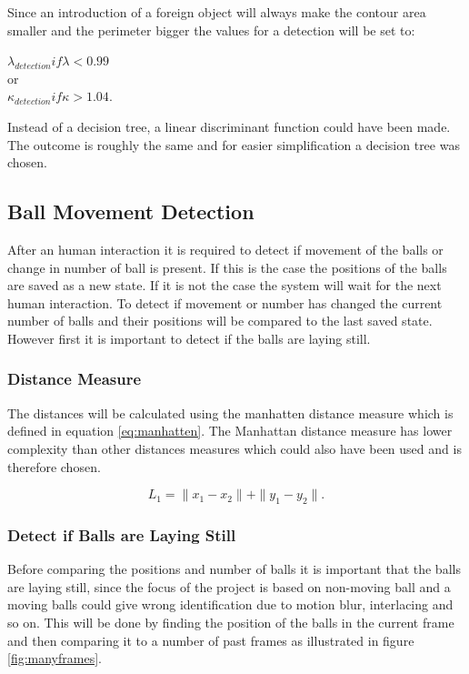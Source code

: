 Since an introduction of a foreign object will always make the contour area smaller and the perimeter bigger the values for a detection will be set to:

\begin{center}
$\lambda_{detection} if \lambda < 0.99$ \\
or\\
$\kappa_{detection} if \kappa > 1.04$.
\end{center}

Instead of a decision tree, a linear discriminant function could have been made. The outcome is roughly the same and for easier simplification a decision tree was chosen.

\subsection{Ball Movement Detection}
After an human interaction it is required to detect if movement of the balls or change in number of ball is present. If this is the case the 
positions of the balls are saved as a new state. If it is not the case the system will wait for the next human interaction. To detect if movement or number has changed the current number of balls and their positions will be compared to the last saved state. However first it is important to detect if the balls are laying still.

\subsubsection{Distance Measure}
The distances will be calculated using the manhatten distance measure which is defined in equation \ref{eq:manhatten}. The Manhattan distance measure has lower complexity than other distances measures which could also have been used and is therefore chosen. 

\begin{equation}
L_{1} = \parallel x_{1}-x_{2}\parallel + \parallel y_{1}-y_{2}\parallel.
\label{eq:manhatten}
\end{equation}

\subsubsection{Detect if Balls are Laying Still}
Before comparing the positions and number of balls it is important that the balls are laying still, since the focus of the project is based on non-moving ball and a moving balls could give wrong identification due to motion blur, interlacing and so on. This will be done by finding the position of the balls in the current frame and then comparing it to a number of past frames as illustrated in figure \ref{fig:manyframes}.


